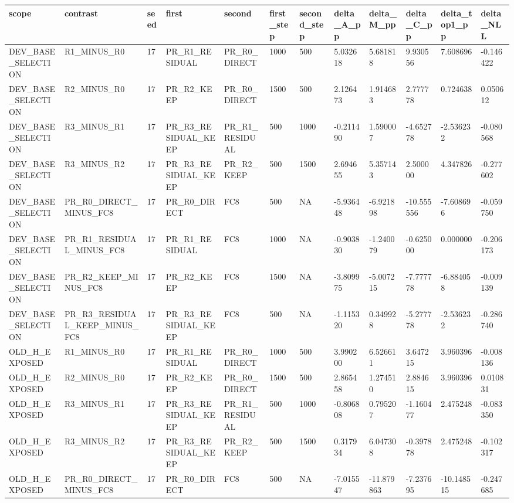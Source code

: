 \begin{tabular}{llllllllllll}
\toprule
scope & contrast & seed & first & second & first\_step & second\_step & delta\_A\_pp & delta\_M\_pp & delta\_C\_pp & delta\_top1\_pp & delta\_NLL \\
\midrule
DEV\_BASE\_SELECTION & R1\_MINUS\_R0 & 17 & PR\_R1\_RESIDUAL & PR\_R0\_DIRECT & 1000 & 500 & 5.032618 & 5.681818 & 9.930556 & 7.608696 & -0.146422 \\
DEV\_BASE\_SELECTION & R2\_MINUS\_R0 & 17 & PR\_R2\_KEEP & PR\_R0\_DIRECT & 1500 & 500 & 2.126473 & 1.914683 & 2.777778 & 0.724638 & 0.050612 \\
DEV\_BASE\_SELECTION & R3\_MINUS\_R1 & 17 & PR\_R3\_RESIDUAL\_KEEP & PR\_R1\_RESIDUAL & 500 & 1000 & -0.211490 & 1.590007 & -4.652778 & -2.536232 & -0.080568 \\
DEV\_BASE\_SELECTION & R3\_MINUS\_R2 & 17 & PR\_R3\_RESIDUAL\_KEEP & PR\_R2\_KEEP & 500 & 1500 & 2.694655 & 5.357143 & 2.500000 & 4.347826 & -0.277602 \\
DEV\_BASE\_SELECTION & PR\_R0\_DIRECT\_MINUS\_FC8 & 17 & PR\_R0\_DIRECT & FC8 & 500 & NA & -5.936448 & -6.921898 & -10.555556 & -7.608696 & -0.059750 \\
DEV\_BASE\_SELECTION & PR\_R1\_RESIDUAL\_MINUS\_FC8 & 17 & PR\_R1\_RESIDUAL & FC8 & 1000 & NA & -0.903830 & -1.240079 & -0.625000 & 0.000000 & -0.206173 \\
DEV\_BASE\_SELECTION & PR\_R2\_KEEP\_MINUS\_FC8 & 17 & PR\_R2\_KEEP & FC8 & 1500 & NA & -3.809975 & -5.007215 & -7.777778 & -6.884058 & -0.009139 \\
DEV\_BASE\_SELECTION & PR\_R3\_RESIDUAL\_KEEP\_MINUS\_FC8 & 17 & PR\_R3\_RESIDUAL\_KEEP & FC8 & 500 & NA & -1.115320 & 0.349928 & -5.277778 & -2.536232 & -0.286740 \\
OLD\_H\_EXPOSED & R1\_MINUS\_R0 & 17 & PR\_R1\_RESIDUAL & PR\_R0\_DIRECT & 1000 & 500 & 3.990200 & 6.526611 & 3.647215 & 3.960396 & -0.008136 \\
OLD\_H\_EXPOSED & R2\_MINUS\_R0 & 17 & PR\_R2\_KEEP & PR\_R0\_DIRECT & 1500 & 500 & 2.865458 & 1.274510 & 2.884615 & 3.960396 & 0.010831 \\
OLD\_H\_EXPOSED & R3\_MINUS\_R1 & 17 & PR\_R3\_RESIDUAL\_KEEP & PR\_R1\_RESIDUAL & 500 & 1000 & -0.806808 & 0.795207 & -1.160477 & 2.475248 & -0.083350 \\
OLD\_H\_EXPOSED & R3\_MINUS\_R2 & 17 & PR\_R3\_RESIDUAL\_KEEP & PR\_R2\_KEEP & 500 & 1500 & 0.317934 & 6.047308 & -0.397878 & 2.475248 & -0.102317 \\
OLD\_H\_EXPOSED & PR\_R0\_DIRECT\_MINUS\_FC8 & 17 & PR\_R0\_DIRECT & FC8 & 500 & NA & -7.015547 & -11.879863 & -7.237695 & -10.148515 & -0.247685 \\

\end{tabular}
